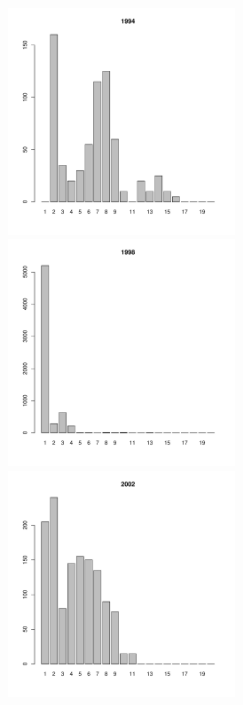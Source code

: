 \documentclass[12pt, a4paper]{article}
\begin{document}
\begin{figure}[h]
\begin{multicols}{3}
\hfill
\includegraphics[width=60mm]{../White_Sea/Luvenga_Goreliy/middle_1994_.pdf}
\hfill
\includegraphics[width=60mm]{../White_Sea/Luvenga_Goreliy/middle_1998_.pdf}
\hfill
\includegraphics[width=60mm]{../White_Sea/Luvenga_Goreliy/middle_2002_.pdf}
\end{multicols}



\end{figure}
\end{document}
